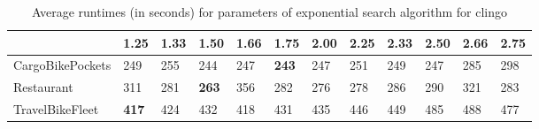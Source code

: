 \begin{table}[ht]
\centering
\caption{Average runtimes (in seconds) for  parameters of exponential search algorithm for clingo}
\label{tab:results:exponential}
\begin{tabular}{l|lllllllllll}
\toprule
 & 1.25 & 1.33 & 1.50 & 1.66 & 1.75 & 2.00 & 2.25 & 2.33 & 2.50 & 2.66 & 2.75 \\
\midrule
CargoBikePockets & 249 & 255 & 244 & 247 & \textbf{243} & 247 & 251 & 249 & 247 & 285 & 298 \\
\cline{1-12}
Restaurant & 311 & 281 & \textbf{263} & 356 & 282 & 276 & 278 & 286 & 290 & 321 & 283 \\
\cline{1-12}
TravelBikeFleet & \textbf{417} & 424 & 432 & 418 & 431 & 435 & 446 & 449 & 485 & 488 & 477 \\
\cline{1-12}
\bottomrule
\end{tabular}
\end{table}

